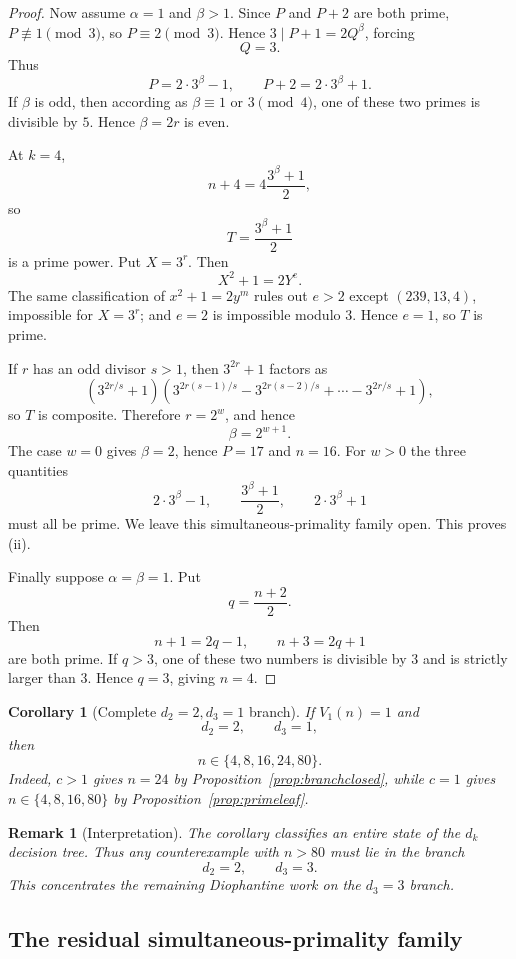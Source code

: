 \documentclass[11pt]{article}
\newtheorem{corollary}[theorem]{Corollary}
\newtheorem{remark}[theorem]{Remark}
\begin{document}
\begin{proof}
Now assume $\alpha=1$ and $\beta>1$.  Since $P$ and $P+2$ are both prime,
$P\not\equiv1\pmod3$, so $P\equiv2\pmod3$.  Hence
$3\mid P+1=2Q^\beta$, forcing
\[
Q=3.
\]
Thus
\[
P=2\cdot3^\beta-1,
\qquad
P+2=2\cdot3^\beta+1.
\]
If $\beta$ is odd, then according as $\beta\equiv1$ or $3\pmod4$, one of
these two primes is divisible by $5$.  Hence $\beta=2r$ is even.

At $k=4$,
\[
n+4=4\frac{3^\beta+1}{2},
\]
so
\[
T=\frac{3^\beta+1}{2}
\]
is a prime power.  Put $X=3^r$.  Then
\[
X^2+1=2Y^e.
\]
The same classification of $x^2+1=2y^m$ rules out $e>2$ except
$(239,13,4)$, impossible for $X=3^r$; and $e=2$ is impossible modulo
$3$.  Hence $e=1$, so $T$ is prime.

If $r$ has an odd divisor $s>1$, then $3^{2r}+1$ factors as
\[
(3^{2r/s}+1)
\left(3^{2r(s-1)/s}-3^{2r(s-2)/s}+\cdots-3^{2r/s}+1\right),
\]
so $T$ is composite.  Therefore $r=2^w$, and hence
\[
\boxed{\beta=2^{w+1}}.
\]
The case $w=0$ gives $\beta=2$, hence $P=17$ and $n=16$.
For $w>0$ the three quantities
\[
2\cdot3^\beta-1,
\qquad
\frac{3^\beta+1}{2},
\qquad
2\cdot3^\beta+1
\]
must all be prime.  We leave this simultaneous-primality family open.
This proves (ii).

Finally suppose $\alpha=\beta=1$.  Put
\[
q=\frac{n+2}{2}.
\]
Then
\[
n+1=2q-1,
\qquad
n+3=2q+1
\]
are both prime.  If $q>3$, one of these two numbers is divisible by $3$
and is strictly larger than $3$.  Hence $q=3$, giving $n=4$.
\end{proof}

\begin{corollary}[Complete $d_2=2,d_3=1$ branch]
\label{cor:d2d3one}
If $V_1(n)=1$ and
\[
d_2=2,
\qquad d_3=1,
\]
then
\[
\boxed{n\in\{4,8,16,24,80\}}.
\]
Indeed, $c>1$ gives $n=24$ by Proposition~\ref{prop:branchclosed}, while
$c=1$ gives $n\in\{4,8,16,80\}$ by Proposition~\ref{prop:primeleaf}.
\end{corollary}

\begin{remark}[Interpretation]
The corollary classifies an entire state of the $d_k$ decision tree.  Thus
any counterexample with $n>80$ must lie in the branch
\[
\boxed{d_2=2,\qquad d_3=3.}
\]
This concentrates the remaining Diophantine work on the $d_3=3$ branch.
\end{remark}

\subsection{The residual simultaneous-primality family}
\end{document}
